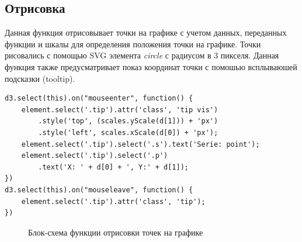 \documentclass[a4paper,14pt]{extreport}
\begin{document}
\subsection{Отрисовка}
\hspace{4ex}Данная функция отрисовывает точки на графике с учетом данных, переданных функции и шкалы для определения положения точки на графике. Точки рисовались с помощью SVG элемента \textit{circle} с радиусом в 3 пикселя.
\hspace{4ex}Данная функция также предусматривает показ координат точки с помошью всплываюшей подсказки (tooltip).
\begin{verbatim}
d3.select(this).on("mouseenter", function() {
    element.select('.tip').attr('class', 'tip vis')
        .style('top', (scales.yScale(d[1])) + 'px')
        .style('left', scales.xScale(d[0]) + 'px');
    element.select('.tip').select('.s').text('Serie: point');
    element.select('.tip').select('.p')
        .text('X: ' + d[0] + ', Y:' + d[1]);
})
d3.select(this).on("mouseleave", function() {
    element.select('.tip').attr('class', 'tip');
})
\end{verbatim}
\newpage
\begin{figure}[h]
\caption{Блок-схема функции отрисовки точек на графике}
\label{ris:image}
\end{figure}
\end{document}
